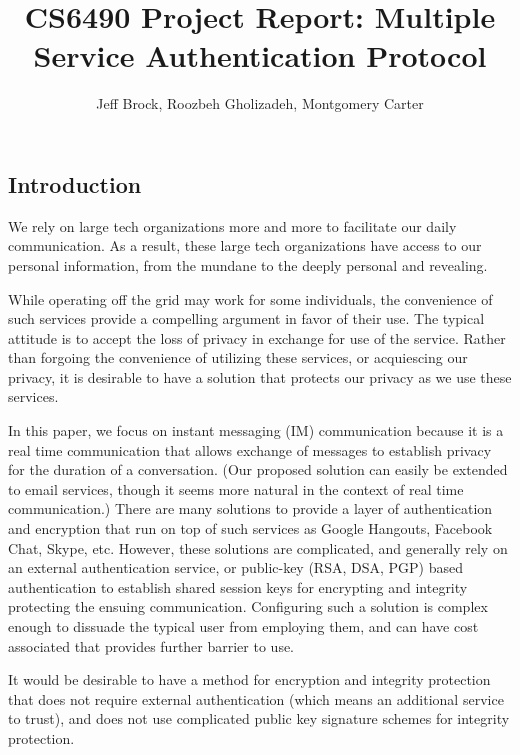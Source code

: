 \documentclass[twoside,10pt]{article}
\title{CS6490 Project Report: Multiple Service Authentication Protocol}
\author{Jeff Brock, Roozbeh Gholizadeh, Montgomery Carter}
\date{}
\begin{document}
\maketitle
\newpage
\begin{multicols}{2}

\section{Introduction}
We rely on large tech organizations more and more to facilitate our daily communication.  As a result, these large tech organizations have access to our personal information, from the mundane to the deeply personal and revealing.

While operating off the grid may work for some individuals, the convenience of such services provide a compelling argument in favor of their use.  The typical attitude is to accept the loss of privacy in exchange for use of the service.  Rather than forgoing the convenience of utilizing these services, or acquiescing our privacy, it is desirable to have a solution that protects our privacy as we use these services.

In this paper, we focus on instant messaging (IM) communication because it is a real time communication that allows exchange of messages to establish privacy for the duration of a conversation.  (Our proposed solution can easily be extended to email services, though it seems more natural in the context of real time communication.)  There are many solutions to provide a layer of authentication and encryption that run on top of such services as Google Hangouts, Facebook Chat, Skype, etc.  However, these solutions are complicated, and generally rely on an external authentication service, or public-key (RSA, DSA, PGP) based authentication to establish shared session keys for encrypting and integrity protecting the ensuing communication.  Configuring such a solution is complex enough to dissuade the typical user from employing them, and can have cost associated that provides further barrier to use.

It would be desirable to have a method for encryption and integrity protection that does not require external authentication (which means an additional service to trust), and does not use complicated public key signature schemes for integrity protection.


\end{multicols}
\end{document}
